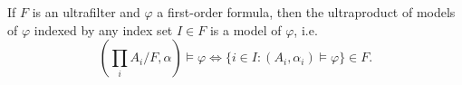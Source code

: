 \begin{lem}
If $F$ is an ultrafilter and $\varphi$ a first-order formula, then the ultraproduct of models of $\varphi$ indexed by any index set $I\in F$ is a model of $\varphi$, i.e. \[(\prod_i A_i / F , \alpha)\models\varphi\Leftrightarrow\{i\in I: (A_i, \alpha_i)\models\varphi\}\in F.\]
\end{lem}


\nocite{*}




